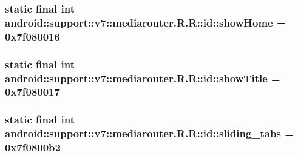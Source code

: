 \hypertarget{classandroid_1_1support_1_1v7_1_1mediarouter_1_1_r_1_1id_868ad22fd7ae63181fcd3c7c97d21f69}{
\subsubsection[{showHome}]{\setlength{\rightskip}{0pt plus 5cm}static final int android::support::v7::mediarouter.R.R::id::showHome = 0x7f080016}}
\label{classandroid_1_1support_1_1v7_1_1mediarouter_1_1_r_1_1id_868ad22fd7ae63181fcd3c7c97d21f69}


\hypertarget{classandroid_1_1support_1_1v7_1_1mediarouter_1_1_r_1_1id_21b7200d4012d31c79ea666a676dba28}{
\subsubsection[{showTitle}]{\setlength{\rightskip}{0pt plus 5cm}static final int android::support::v7::mediarouter.R.R::id::showTitle = 0x7f080017}}
\label{classandroid_1_1support_1_1v7_1_1mediarouter_1_1_r_1_1id_21b7200d4012d31c79ea666a676dba28}


\hypertarget{classandroid_1_1support_1_1v7_1_1mediarouter_1_1_r_1_1id_fe0f5387984e1d29d8a094ac2e04a312}{
\subsubsection[{sliding\_\-tabs}]{\setlength{\rightskip}{0pt plus 5cm}static final int android::support::v7::mediarouter.R.R::id::sliding\_\-tabs = 0x7f0800b2}}
\label{classandroid_1_1support_1_1v7_1_1mediarouter_1_1_r_1_1id_fe0f5387984e1d29d8a094ac2e04a312}


